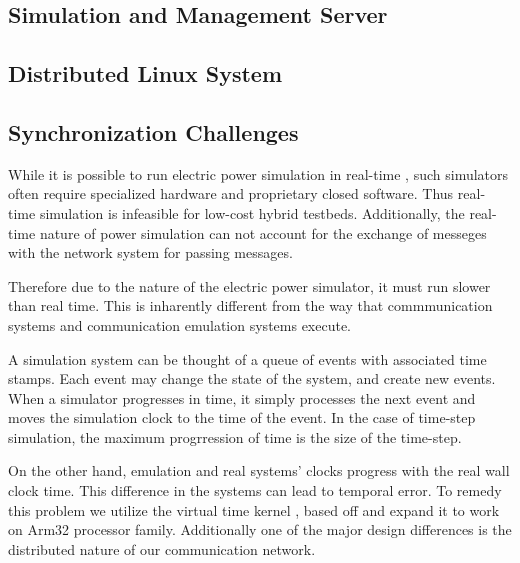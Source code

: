 \subsection{Simulation and Management Server}

\subsection{Distributed Linux System}

\subsection{Synchronization Challenges}
While it is possible to run electric power simulation in real-time \cite{rt-sim}, such simulators often require specialized hardware and proprietary closed software. Thus real-time simulation is infeasible for low-cost hybrid testbeds. Additionally, the real-time nature of power simulation can not account for the exchange of messeges with the network system for passing messages.

Therefore due to the nature of the electric power simulator, it must run slower than real time.
This is inharently different from the way that commmunication systems and communication emulation systems execute.

A simulation system can be thought of a queue of events with associated time stamps.
Each event may change the state of the system, and create new events.
When a simulator progresses in time, it simply processes the next event and moves the simulation clock to the time of the event. In the case of time-step simulation, the maximum progrression of time is the size of the time-step.

On the other hand, emulation and real systems' clocks progress with the real wall clock time. This difference in the systems can lead to temporal error. To remedy this problem we utilize the virtual time kernel \cite{Yan:VTS:pads15},\cite{Yan:VTM:sosr15} based off \cite{Lamps:TK:pads14} and expand it to work on Arm32 processor family. Additionally one of the major design differences is the distributed nature of our communication network.



